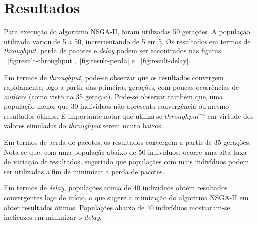 \documentclass[conference]{IEEEtran}
\begin{document}
\section{Resultados}

Para execução do algoritmo NSGA-II, foram utilizadas 50 gerações.
A população utilizada variou de 5 a 50, incrementando de 5 em 5. Os resultados em termos de \textit{throughput}, perda de pacotes e \textit{delay}
podem ser encontrados nas figuras ~\ref{fig:result-throughput},~\ref{fig:result-perda} e ~\ref{fig:result-delay}.

Em termos de \textit{throughput}, pode-se observar que os resultados convergem rapidamente, logo a partir das primeiras gerações, com poucas ocorrências de \textit{outliers} (como visto na 35 geração).
Pode-se observar também que, uma população menor que 30 indíviduos não apresenta convergência ou mesmo resultados ótimos. É importante notar que utiliza-se $throughput^{-1}$ em virtude dos valores simulados do \textit{throughput} serem muito baixos.

Em termos de perda de pacotes, os resultados convergem a partir de 35 gerações. Nota-se que, com uma população abaixo de 50 indivíduos, ocorre uma alta taxa de variação de resultados, sugerindo que populações com mais indivíduos podem ser utilizadas a fim de minimizar a perda de pacotes.

Em termos de \textit{delay}, populações acima de 40 indivíduos obtém resultados convergentes logo de início, o que sugere a otimização do algoritmo NSGA-II em obter resultados ótimos.
Populações abaixo de 40 indivíduos mostraram-se ineficazes em minimizar o \textit{delay}.
\end{document}
